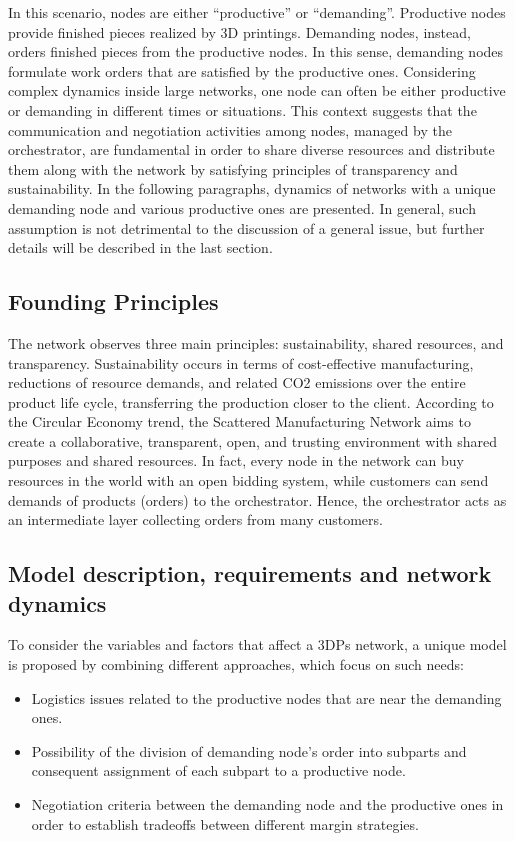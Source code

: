 In this scenario, nodes are either “productive” or “demanding”. Productive nodes provide finished pieces realized by 3D printings. Demanding nodes, instead, orders finished pieces from the productive nodes. In this sense, demanding nodes formulate work orders that are satisfied by the productive ones. Considering complex dynamics inside large networks, one node can often be either productive or demanding in different times or situations. This context suggests that the communication and negotiation activities among nodes, managed by the orchestrator, are fundamental in order to share diverse resources and distribute them along with the network by satisfying principles of transparency and sustainability. In the following paragraphs, dynamics of networks with a unique demanding node and various productive ones are presented. In general, such assumption is not detrimental to the discussion of a general issue, but further details will be described in the last section.
\subsection{Founding Principles}
The network observes three main principles: sustainability, shared resources, and transparency. Sustainability occurs in terms of cost-effective manufacturing, reductions of resource demands, and related CO2 emissions over the entire product life cycle, transferring the production closer to the client. According to the Circular Economy trend, the Scattered Manufacturing Network aims to create a collaborative, transparent, open, and trusting environment with shared purposes and shared resources. In fact, every node in the network can buy resources in the world with an open bidding system, while customers can send demands of products (orders) to the orchestrator. Hence, the orchestrator acts as an intermediate layer collecting orders from many customers.
\subsection{Model description, requirements and network dynamics}
To consider the variables and factors that affect a 3DPs network, a unique model is proposed by combining different approaches, which focus on such needs:
\begin{itemize}
    \item Logistics issues related to the productive nodes that are near the demanding ones.
    \item Possibility of the division of demanding node’s order into subparts and consequent assignment of each subpart to a productive node.
    \item Negotiation criteria between the demanding node and the productive ones in order to establish tradeoffs between different margin strategies.
\end{itemize}

